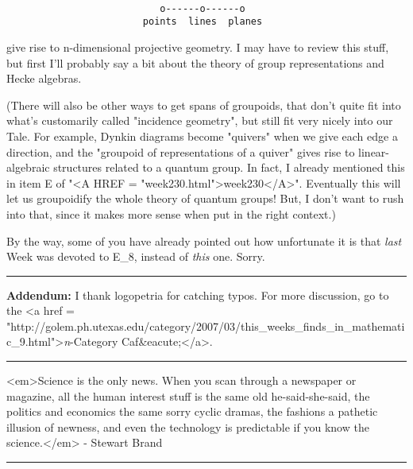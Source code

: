 \begin{verbatim}

                           o------o------o
                        points  lines  planes      
\end{verbatim}
    
give rise to n-dimensional projective geometry.  I may have to review
this stuff, but first I'll probably say a bit about the theory of 
group representations and Hecke algebras.

(There will also be other ways to get spans of groupoids, that don't
quite fit into what's customarily called "incidence
geometry", but still fit very nicely into our Tale.  For example,
Dynkin diagrams become "quivers" when we give each edge a
direction, and the "groupoid of representations of a quiver"
gives rise to linear-algebraic structures related to a quantum group.
In fact, I already mentioned this in item E of "<A HREF =
"week230.html">week230</A>".  Eventually this will let us
groupoidify the whole theory of quantum groups!  But, I don't want to
rush into that, since it makes more sense when put in the right
context.)


By the way, some of you have already pointed out how unfortunate it is
that \emph{last} Week was devoted to E_{8}, instead of
\emph{this} one.  Sorry.

\par\noindent\rule{\textwidth}{0.4pt}
\textbf{Addendum:} I thank logopetria for catching typos.
For more discussion, go to the <a href = "http://golem.ph.utexas.edu/category/2007/03/this_weeks_finds_in_mathematic_9.html">\emph{n}-Category 
Caf&eacute;</a>.

\par\noindent\rule{\textwidth}{0.4pt}
<em>Science is the only news. When you scan through a newspaper or magazine, 
all the human interest stuff is the same old he-said-she-said, the politics 
and economics the same sorry cyclic dramas, the fashions a pathetic illusion 
of newness, and even the technology is predictable if you know the 
science.</em> - Stewart Brand

\par\noindent\rule{\textwidth}{0.4pt}

